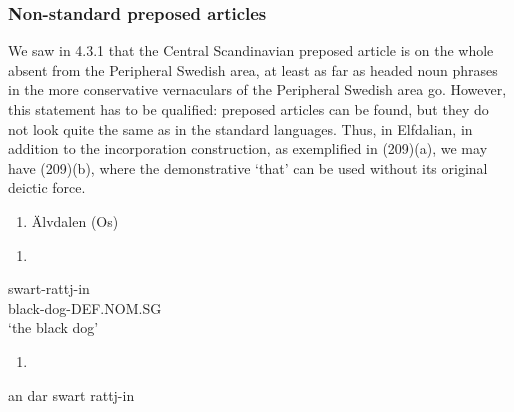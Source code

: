 \subsubsection[Non{}-standard preposed articles ]{\rmfamily Non-standard preposed articles }
\label{bkm:Ref264372580}\label{bkm:Ref264372864}\label{bkm:Ref264372909}%
We saw in 4.3.1 that the Central Scandinavian preposed article is on the whole absent from the Peripheral Swedish area, at least as far as headed noun phrases in the more conservative vernaculars of the Peripheral Swedish area go. However, this statement has to be qualified: preposed articles can be found, but they do not look quite the same as in the standard languages. Thus, in Elfdalian, in addition to the incorporation construction, as exemplified in (209)(a), we may have (209)(b), where the demonstrative  ‘that’ can be used without its original deictic force.

\begin{enumerate} %
\item 
\label{bkm:Ref155154659}Älvdalen (Os)

\end{enumerate} %
\setcounter{listLFOxcviiileveli}{0}
\begin{enumerate} %
\item 
\end{enumerate} %
\ea\label{}
\gll swart-rattj-in\\


black-dog-DEF.NOM.SG\\ %


‘the black dog’
\z


\begin{enumerate} %
\item 
\end{enumerate} %
\ea\label{}
\gll an  dar  swart  rattj-in\\


